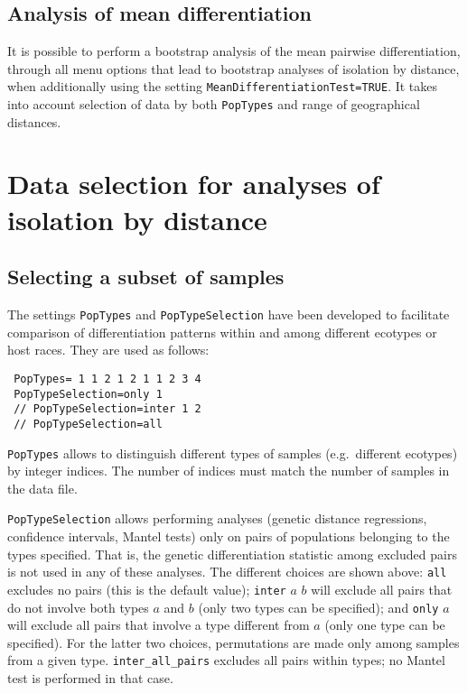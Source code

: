 \documentclass[12pt,]{book}
\begin{document}
\subsection{Analysis of mean
differentiation}\label{analysis-of-mean-differentiation}

 It is possible to perform a
bootstrap analysis of the mean pairwise differentiation, through all
menu options that lead to bootstrap analyses of isolation by distance,
when additionally using the setting
\texttt{MeanDifferentiationTest=TRUE}. It takes into account selection
of data by both \texttt{PopTypes} and range of geographical distances.

\section{Data selection for analyses of isolation by
distance}\label{data-selection-for-analyses-of-isolation-by-distance}

\subsection{Selecting a subset of
samples}\label{selecting-a-subset-of-samples}

  The settings
\texttt{PopTypes} and \texttt{PopTypeSelection} have been developed to
facilitate comparison of differentiation patterns within and among
different ecotypes or host races. They
are used as follows:

\begin{verbatim}
 PopTypes= 1 1 2 1 2 1 1 2 3 4
 PopTypeSelection=only 1
 // PopTypeSelection=inter 1 2
 // PopTypeSelection=all
\end{verbatim}

\texttt{PopTypes} allows to distinguish different types of samples
(e.g.~different ecotypes) by integer indices. The number of indices must
match the number of samples in the data file.

\texttt{PopTypeSelection} allows performing analyses (genetic distance
regressions, confidence intervals, Mantel tests) only on pairs of
populations belonging to the types specified. That is, the genetic
differentiation statistic among excluded pairs is not used in any of
these analyses. The different choices are shown above: \texttt{all}
excludes no pairs (this is the default value); \texttt{inter} \(a\)
\(b\) will exclude all pairs that do not involve both types \(a\) and
\(b\) (only two types can be specified); and \texttt{only} \(a\) will
exclude all pairs that involve a type different from \(a\) (only one
type can be specified). For the latter two choices, permutations are
made only among samples from a given type. \texttt{inter\_all\_pairs}
excludes all pairs within types; no Mantel test is performed in that
case.
\end{document}
